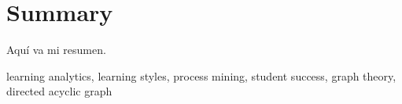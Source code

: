 \chapter*{Summary}

\begin{otherlanguage}{english}

Aquí va mi resumen.

\small{ learning analytics, \; learning styles, \; process mining, \; student success, \; graph theory, \; directed acyclic graph}

\end{otherlanguage}